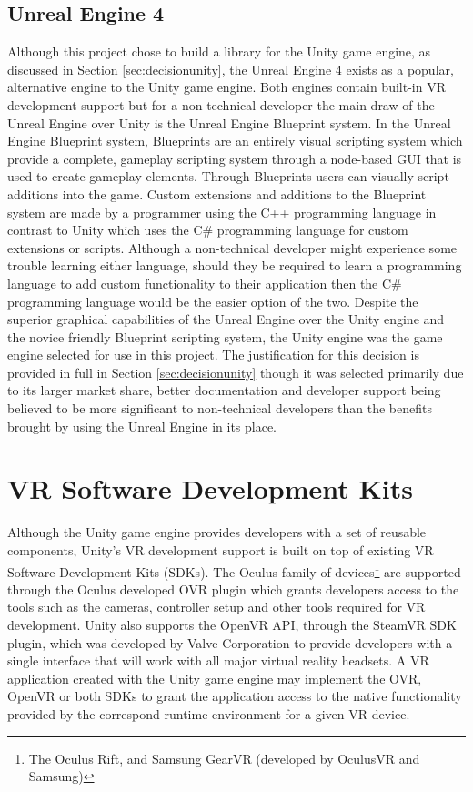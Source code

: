 \documentclass{l4proj}
\begin{document}
\subsection{Unreal Engine 4}
\label{sec:contextunrealengine}
Although this project chose to build a library for the Unity game engine, as discussed in Section \ref{sec:decisionunity}, the Unreal Engine 4 exists as a popular, alternative engine to the Unity game engine. Both engines contain built-in VR development support but for a non-technical developer the main draw of the Unreal Engine over Unity is the Unreal Engine Blueprint system. In the Unreal Engine Blueprint system, Blueprints are an entirely visual scripting system which provide a complete, gameplay scripting system through a node-based GUI that is used to create gameplay elements. Through Blueprints users can visually script additions into the game. Custom extensions and additions to the Blueprint system are made by a programmer using the C++ programming language in contrast to Unity which uses the C\# programming language for custom extensions or scripts. Although a non-technical developer might experience some trouble learning either language, should they be required to learn a programming language to add custom functionality to their application then the C\# programming language would be the easier option of the two. Despite the superior graphical capabilities of the Unreal Engine over the Unity engine and the novice friendly Blueprint scripting system, the Unity engine was the game engine selected for use in this project. The justification for this decision is provided in full in Section \ref{sec:decisionunity} though it was selected primarily due to its larger market share, better documentation and developer support being believed to be more significant to non-technical developers than the benefits brought by using the Unreal Engine in its place. 

\section{VR Software Development Kits}
\label{sec:contextvrsdks}
Although the Unity game engine provides developers with a set of reusable components, Unity's VR development support is built on top of existing VR Software Development Kits (SDKs). The Oculus family of devices\footnote{The Oculus Rift, and Samsung GearVR (developed by OculusVR and Samsung)} are supported through the Oculus developed OVR plugin which grants developers access to the tools such as the cameras, controller setup and other tools required for VR development. Unity also supports the OpenVR API, through the SteamVR SDK plugin, which was developed by Valve Corporation to provide developers with a single interface that will work with all major virtual reality headsets. A VR application created with the Unity game engine may implement the OVR, OpenVR or both SDKs to grant the application access to the native functionality provided by the correspond runtime environment for a given VR device.
\end{document}
